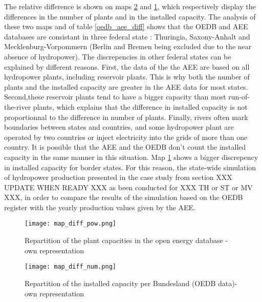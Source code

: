 The relative difference is shown on maps \ref{map_diff_num} and \ref{map_diff_pow}, which respectively display the differences in the number of plants and in the installed capacity. The analysis of these two maps and of table \ref{oedb_aee_diff} shows that the OEDB and AEE databases are consistant in three federal state : Thuringia, Saxony-Anhalt and Mecklenburg-Vorpommern (Berlin and Bremen being excluded due to the near absence of hydropower). The discrepencies in other federal states can be explained by different reasons. First, the data of the the AEE are based on all hydropower plants, including reservoir plants. This is why both the number of plants and the installed capacity are greater in the AEE data for most states. Second,these reservoir plants tend to have a bigger capacity than most run-of-the-river plants, which explains that the difference in installed capacity is not proportionnal to the difference in number of plants. Finally, rivers often mark boundaries between states and countries, and some hydropower plant are operated by two countries or inject electricity into the grids of more than one country. It is possible that the AEE and the OEDB don't count the installed capacity in the same manner in this situation. Map \ref{map_diff_pow} shows a bigger discrepency in installed capacity for border states.
\newline
For this reason, the state-wide simulation of hydropower production presented in the case study from section XXX UPDATE WHEN READY XXX as been conducted for XXX TH or ST or MV XXX, in order to compare the results of the simulation based on the OEDB register with the yearly production values given by the AEE.

\begin{figure}[H]
\texttt{[image: map\_diff\_pow.png]}
\caption[Repartition of the ROR plant capacities in the open energy database]{Repartition of the plant capacities in the open energy database - own representation}
\centering
\label{map_diff_pow}
\end{figure}


\begin{figure}[H]
\texttt{[image: map\_diff\_num.png]}
\caption[Repartition of the installed capacity per Bundesland (OEDB data)]{Repartition of the installed capacity per Bundesland (OEDB data)- own representation}
\centering
\label{map_diff_num}
\end{figure}



